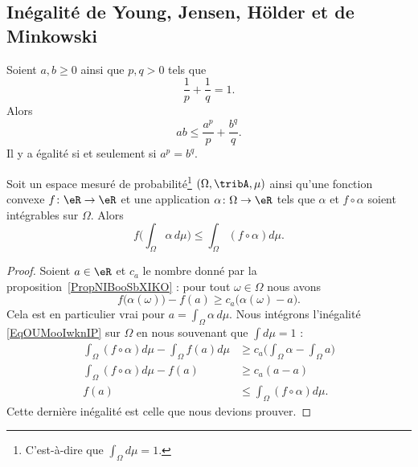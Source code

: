 \subsection{Inégalité de Young, Jensen, Hölder et de Minkowski}

\begin{proposition}     \label{PROPooCQUBooCvtMSi}
    Soient \( a,b\geq 0\) ainsi que \( p,q>0\) tels que
    \begin{equation}
        \frac{1}{ p }+\frac{1}{ q }=1.
    \end{equation}
    Alors
    \begin{equation}
        ab\leq \frac{ a^p }{ p }+\frac{ b^q }{ q }.
    \end{equation}
    Il y a égalité si et seulement si \( a^p=b^q\).
\end{proposition}

\begin{proposition} \label{PropXISooBxdaLk}
    Soit un espace mesuré de probabilité\footnote{C'est-à-dire que \( \int_{\Omega}d\mu=1\).} \( (\Omega,\tribA,\mu)\) ainsi qu'une fonction convexe \( f\colon \eR\to \eR\) et une application \( \alpha\colon \Omega\to \eR\) tels que \( \alpha\) et \( f\circ \alpha\) soient intégrables sur \( \Omega\). Alors
    \begin{equation}
        f\Big( \int_{\Omega}\alpha\,d\mu \Big)\leq \int_{\Omega}(f\circ\alpha) d\mu.
    \end{equation}
\end{proposition}

\begin{proof}
    Soient \( a\in \eR\) et \( c_a\) le nombre donné par la proposition~\ref{PropNIBooSbXIKO} : pour tout \( \omega\in \Omega\) nous avons
    \begin{equation}    \label{EqOUMooIwknIP}
        f\big( \alpha(\omega) \big)-f(a)\geq c_a\big( \alpha(\omega)-a \big).
    \end{equation}
    Cela est en particulier vrai pour \( a=\int_{\Omega}\alpha\,d\mu\). Nous intégrons l'inégalité \eqref{EqOUMooIwknIP} sur \( \Omega\) en nous souvenant que \( \int d\mu=1\) :
    \begin{subequations}
        \begin{align}
            \int_{\Omega}(f\circ \alpha)d\mu-\int_{\Omega}f(a)d\mu&\geq c_a\big( \int_{\Omega}\alpha-\int_{\Omega}a \big)\\
            \int_{\Omega}(f\circ \alpha)d\mu-f(a)&\geq c_a(a-a)\\
            f(a)&\leq \int_{\Omega}(f\circ\alpha)d\mu.
        \end{align}
    \end{subequations}
    Cette dernière inégalité est celle que nous devions prouver.
\end{proof}

